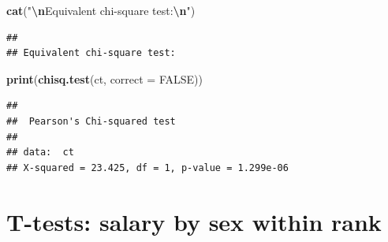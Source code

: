 \documentclass[
]{article}
\newenvironment{Shaded}{\begin{snugshade}}{\end{snugshade}}
\newcommand{\AttributeTok}[1]{\textcolor[rgb]{0.13,0.29,0.53}{#1}}
\newcommand{\ConstantTok}[1]{\textcolor[rgb]{0.56,0.35,0.01}{#1}}
\newcommand{\FunctionTok}[1]{\textcolor[rgb]{0.13,0.29,0.53}{\textbf{#1}}}
\newcommand{\NormalTok}[1]{#1}
\newcommand{\SpecialCharTok}[1]{\textcolor[rgb]{0.81,0.36,0.00}{\textbf{#1}}}
\newcommand{\StringTok}[1]{\textcolor[rgb]{0.31,0.60,0.02}{#1}}
\begin{document}
\begin{Shaded}
\begin{Highlighting}[]
\FunctionTok{cat}\NormalTok{(}\StringTok{"}\SpecialCharTok{\textbackslash{}n}\StringTok{Equivalent chi{-}square test:}\SpecialCharTok{\textbackslash{}n}\StringTok{"}\NormalTok{)}
\end{Highlighting}
\end{Shaded}

\begin{verbatim}
## 
## Equivalent chi-square test:
\end{verbatim}

\begin{Shaded}
\begin{Highlighting}[]
\FunctionTok{print}\NormalTok{(}\FunctionTok{chisq.test}\NormalTok{(ct, }\AttributeTok{correct =} \ConstantTok{FALSE}\NormalTok{))}
\end{Highlighting}
\end{Shaded}

\begin{verbatim}
## 
##  Pearson's Chi-squared test
## 
## data:  ct
## X-squared = 23.425, df = 1, p-value = 1.299e-06
\end{verbatim}

\section{T-tests: salary by sex within
rank}\label{t-tests-salary-by-sex-within-rank}
\end{document}
